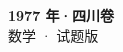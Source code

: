 \documentclass[zihao=-4, a4paper]{ctexart}
\begin{document}
\begin{center}
  {\Large\bfseries 1977 年·四川卷}\\[4pt]
  {\large 数学 · 试题版}
\end{center}
\medskip
{}

\end{document}
